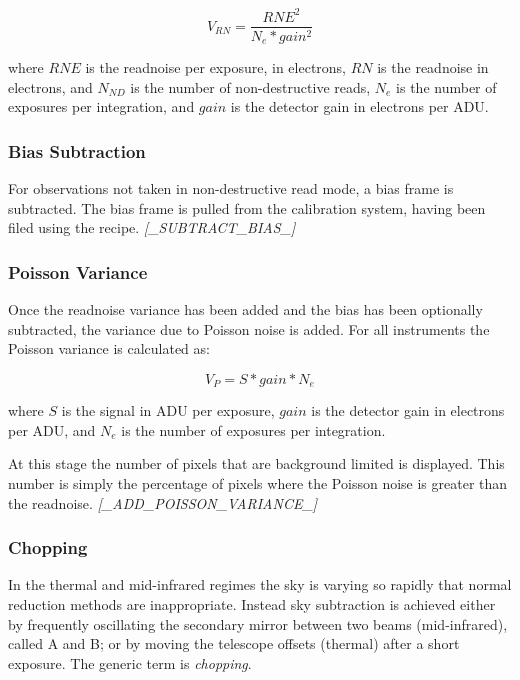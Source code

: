 \documentclass[twoside,11pt,nolof]{starlink}
\begin{document}
\[   V_{RN} = \frac{RNE^{2}}{N_e * gain^{2}} \]

where $RNE$ is the readnoise per exposure, in electrons, $RN$ is the
readnoise in electrons, and $N_{ND}$ is the number of non-destructive reads,
$N_e$ is the number
of exposures per integration, and $gain$ is the detector gain in electrons
per ADU.

\subsubsection{Bias Subtraction\label{bias_subtraction}}

For observations not taken in non-destructive read mode, a bias frame
is subtracted. The bias frame is pulled from the calibration system,
having been filed using the 
recipe.
\newline \emph{[\_SUBTRACT\_BIAS\_]}

\subsubsection{Poisson Variance\label{poisson_variance}}

Once the readnoise variance has been added and the bias has been optionally
subtracted, the variance due to Poisson noise is added. For all instruments
the Poisson variance is calculated as:

\[   V_{P} = S * gain * N_e \]

where $S$ is the signal in ADU per exposure, $gain$ is the detector
gain in electrons per ADU, and $N_e$ is the number of exposures per
integration.

At this stage the number of pixels that are background limited is
displayed. This number is simply the percentage of pixels where the
Poisson noise is greater than the readnoise.
\newline \emph{[\_ADD\_POISSON\_VARIANCE\_]}

\subsubsection{Chopping\label{chopping}}

In the thermal and mid-infrared regimes the sky is varying so rapidly
that normal reduction methods are inappropriate. Instead sky
subtraction is achieved either by frequently oscillating the secondary
mirror between two beams (mid-infrared), called A and B; or by moving
the telescope offsets (thermal) after a short exposure. The generic
term is \emph{chopping}.
\end{document}
